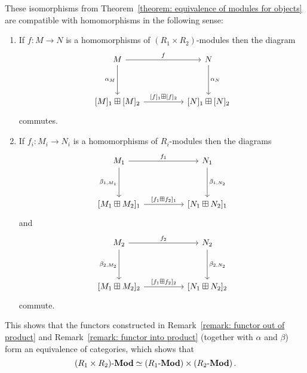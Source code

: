 \begin{theorem}
  \label{theorem: equivalence of modules for morphisms}
  These isomorphisms from Theorem~\ref{theorem: equivalence of modules for objects} are compatible with homomorphisms in the following sense:
  \begin{enumerate}
    \item
      If $f \colon M \to N$ is a homomorphisms of $(R_1 \times R_2)$-modules then the diagram
      \[
        \begin{tikzcd}[sep = huge]
            M
            \arrow{r}[above]{f}
            \arrow{d}[left]{\alpha_M}
          & N
            \arrow{d}[right]{\alpha_N}
          \\
            {[M]_1} \boxplus {[M]_2}
            \arrow{r}[above]{{[f]_1} \boxplus {[f]_2}}
          & {[N]_1} \boxplus {[N]_2}
        \end{tikzcd}
      \]
      commutes.
    \item
      If $f_i \colon M_i \to N_i$ is a homomorphisms of $R_i$-modules then the diagrams
      \[
        \begin{tikzcd}[sep = huge]
            M_1
            \arrow{r}[above]{f_1}
            \arrow{d}[left]{\beta_{1, M_1}}
          & N_1
            \arrow{d}[right]{\beta_{1, N_2}}
          \\
            {[M_1 \boxplus M_2]_1}
            \arrow{r}[above]{{[f_1 \boxplus f_2]_1}}
          & {[N_1 \boxplus N_2]_1}
        \end{tikzcd}
      \]
      and
      \[
        \begin{tikzcd}[sep = huge]
            M_2
            \arrow{r}[above]{f_2}
            \arrow{d}[left]{\beta_{2, M_2}}
          & N_2
            \arrow{d}[right]{\beta_{2, N_2}}
          \\
            {[M_1 \boxplus M_2]_2}
            \arrow{r}[above]{{[f_1 \boxplus f_2]_2}}
          & {[N_1 \boxplus N_2]_2}
        \end{tikzcd}
      \]
      commute.
  \end{enumerate}
\end{theorem}


\begin{remark}
  This shows that the functors constructed in Remark~\ref{remark: functor out of product} and Remark~\ref{remark: functor into product} (together with $\alpha$ and $\beta$) form an equivalence of categories, which shows that
  \[
            (R_1 \times R_2)\text{-}\mathbf{Mod}
    \simeq  (R_1\text{-}\mathbf{Mod}) \times (R_2\text{-}\mathbf{Mod}) \,.
  \]
\end{remark}


